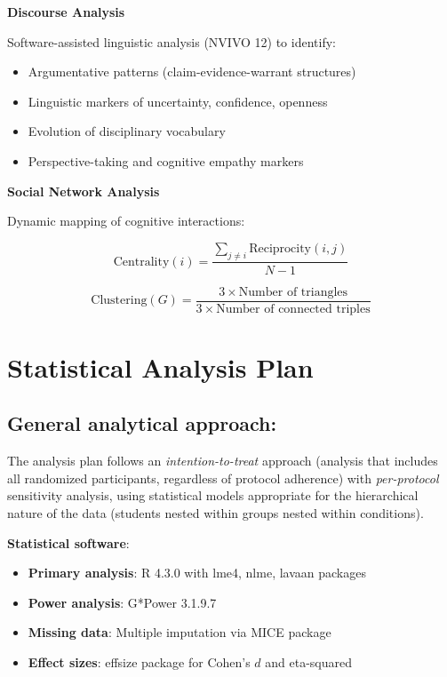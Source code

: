 \textbf{Discourse Analysis}

Software-assisted linguistic analysis (NVIVO 12) to identify:
\begin{itemize}
    \item Argumentative patterns (claim-evidence-warrant structures)
    \item Linguistic markers of uncertainty, confidence, openness
    \item Evolution of disciplinary vocabulary
    \item Perspective-taking and cognitive empathy markers
\end{itemize}

\textbf{Social Network Analysis}

Dynamic mapping of cognitive interactions:

\begin{equation}
\text{Centrality}(i) = \frac{\sum_{j \neq i} \text{Reciprocity}(i,j)}{N-1}
\label{eq:cognitive-centrality}
\end{equation}

\begin{equation}
\text{Clustering}(G) = \frac{3 \times \text{Number of triangles}}{3 \times \text{Number of connected triples}}
\label{eq:clustering-coefficient}
\end{equation}

\section{Statistical Analysis Plan}
\subsection*{General analytical approach:}

The analysis plan follows an \textit{intention-to-treat} approach (analysis that includes all randomized participants, regardless of protocol adherence) with \textit{per-protocol} sensitivity analysis, using statistical models appropriate for the hierarchical nature of the data (students nested within groups nested within conditions).

\textbf{Statistical software}:
\begin{itemize}
    \item \textbf{Primary analysis}: R 4.3.0 with lme4, nlme, lavaan packages
    \item \textbf{Power analysis}: G*Power 3.1.9.7
    \item \textbf{Missing data}: Multiple imputation via MICE package
    \item \textbf{Effect sizes}: effsize package for Cohen's $d$ and eta-squared
\end{itemize}

